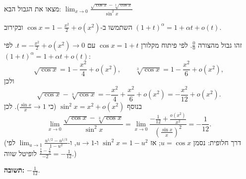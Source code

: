 
\begin{question}
מצאו את הגבול הבא:
$\displaystyle\lim_{x\to0}\frac{\sqrt{\cos x}-\sqrt[3]{\cos x}}{\sin^2x}$
\end{question}

\begin{hint}
השתמשו ב-$\cos x=1-\frac{x^2}{2}+o(x^2)$ ובקירוב $(1+t)^\alpha=1+\alpha t+o(t)$.
\end{hint}

\begin{solution}
זהו גבול מהצורה $\frac00$. לפי פיתוח מקלורן $\cos x=1+t$ עם $t=-\frac{x^2}{2}+o(x^2)\to0$. לפי $(1+t)^\alpha=1+\alpha t+o(t)$:
\[
\sqrt{\cos x}=1-\frac{x^2}{4}+o(x^2),\qquad \sqrt[3]{\cos x}=1-\frac{x^2}{6}+o(x^2),
\]
ולכן
\[
\sqrt{\cos x}-\sqrt[3]{\cos x}=-\frac{x^2}{4}+\frac{x^2}{6}+o(x^2)=-\frac{x^2}{12}+o(x^2).
\]
בנוסף $\sin^2x=x^2+o(x^2)$ (כי $\frac{\sin x}{x}\to1$). לכן
\[
\lim_{x\to0}\frac{\sqrt{\cos x}-\sqrt[3]{\cos x}}{\sin^2x}=\lim_{x\to0}\frac{-\frac{1}{12}+\frac{o(x^2)}{x^2}}{\left(\frac{\sin x}{x}\right)^2}=-\frac1{12}.
\]
(דרך חלופית: נסמן $u=\cos x$; אז $\sin^2x=1-u^2$ ו-$u\to1$, ו-$\lim_{u\to1}\frac{u^{1/2}-u^{1/3}}{1-u^2}$ לפי לופיטל שווה $\frac{\frac12-\frac13}{-2}=-\frac1{12}$.)

\textbf{תשובה:} $-\frac{1}{12}$.
\end{solution}
